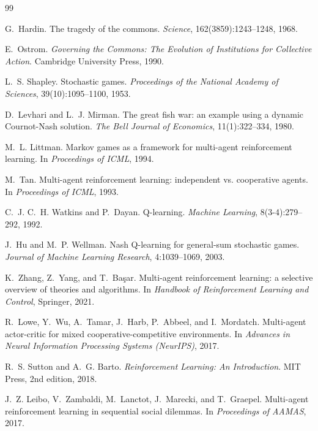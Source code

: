 \documentclass{article}
\begin{document}
\begin{thebibliography}{99}

G.~Hardin.
\newblock The tragedy of the commons.
\newblock \textit{Science}, 162(3859):1243--1248, 1968.

E.~Ostrom.
\newblock \textit{Governing the Commons: The Evolution of Institutions for Collective Action}.
\newblock Cambridge University Press, 1990.

L.~S. Shapley.
\newblock Stochastic games.
\newblock \textit{Proceedings of the National Academy of Sciences}, 39(10):1095--1100, 1953.

D.~Levhari and L.~J. Mirman.
\newblock The great fish war: an example using a dynamic Cournot-Nash solution.
\newblock \textit{The Bell Journal of Economics}, 11(1):322--334, 1980.

M.~L. Littman.
\newblock Markov games as a framework for multi-agent reinforcement learning.
\newblock In \textit{Proceedings of ICML}, 1994.

M.~Tan.
\newblock Multi-agent reinforcement learning: independent vs. cooperative agents.
\newblock In \textit{Proceedings of ICML}, 1993.

C.~J. C.~H. Watkins and P.~Dayan.
\newblock Q-learning.
\newblock \textit{Machine Learning}, 8(3-4):279--292, 1992.

J.~Hu and M.~P. Wellman.
\newblock Nash Q-learning for general-sum stochastic games.
\newblock \textit{Journal of Machine Learning Research}, 4:1039--1069, 2003.

K.~Zhang, Z.~Yang, and T.~Ba\c{s}ar.
\newblock Multi-agent reinforcement learning: a selective overview of theories and algorithms.
\newblock In \textit{Handbook of Reinforcement Learning and Control}, Springer, 2021.

R.~Lowe, Y.~Wu, A.~Tamar, J.~Harb, P.~Abbeel, and I.~Mordatch.
\newblock Multi-agent actor-critic for mixed cooperative-competitive environments.
\newblock In \textit{Advances in Neural Information Processing Systems (NeurIPS)}, 2017.

R.~S. Sutton and A.~G. Barto.
\newblock \textit{Reinforcement Learning: An Introduction}.
\newblock MIT Press, 2nd edition, 2018.

J.~Z. Leibo, V.~Zambaldi, M.~Lanctot, J.~Marecki, and T.~Graepel.
\newblock Multi-agent reinforcement learning in sequential social dilemmas.
\newblock In \textit{Proceedings of AAMAS}, 2017.


\end{thebibliography}
\end{document}
